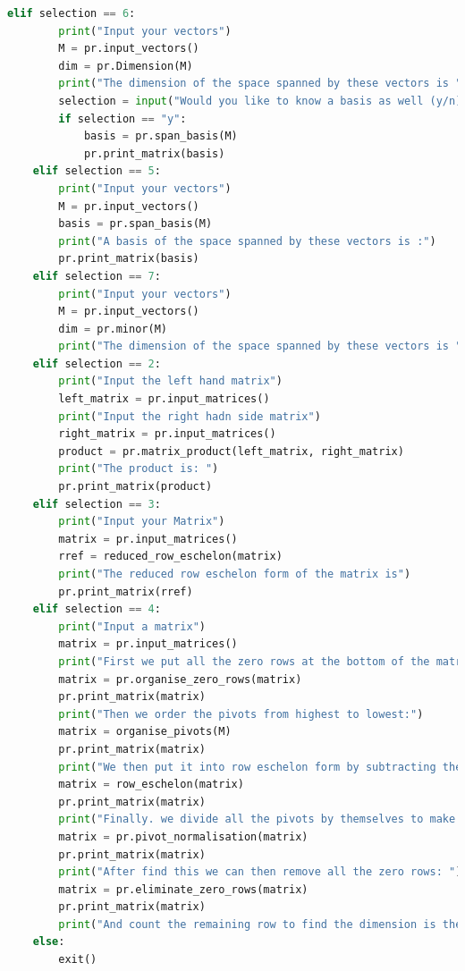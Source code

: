 \documentclass{article}
\begin{document}
\begin{lstlisting}[language=Python, caption=Text Interface, label=main]
    elif selection == 6:
        print("Input your vectors")
        M = pr.input_vectors()
        dim = pr.Dimension(M)
        print("The dimension of the space spanned by these vectors is " + str(dim) +".")
        selection = input("Would you like to know a basis as well (y/n): ")
        if selection == "y":
            basis = pr.span_basis(M)
            pr.print_matrix(basis)
    elif selection == 5:
        print("Input your vectors")
        M = pr.input_vectors()
        basis = pr.span_basis(M)
        print("A basis of the space spanned by these vectors is :")
        pr.print_matrix(basis)
    elif selection == 7:
        print("Input your vectors")
        M = pr.input_vectors()
        dim = pr.minor(M)
        print("The dimension of the space spanned by these vectors is " + str(dim) +".")
    elif selection == 2:
        print("Input the left hand matrix")
        left_matrix = pr.input_matrices()
        print("Input the right hadn side matrix")
        right_matrix = pr.input_matrices()
        product = pr.matrix_product(left_matrix, right_matrix)
        print("The product is: ")
        pr.print_matrix(product)
    elif selection == 3:
        print("Input your Matrix")
        matrix = pr.input_matrices()
        rref = reduced_row_eschelon(matrix)
        print("The reduced row eschelon form of the matrix is")
        pr.print_matrix(rref)
    elif selection == 4:
        print("Input a matrix")
        matrix = pr.input_matrices()
        print("First we put all the zero rows at the bottom of the matrix:")
        matrix = pr.organise_zero_rows(matrix)
        pr.print_matrix(matrix)
        print("Then we order the pivots from highest to lowest:")
        matrix = organise_pivots(M)
        pr.print_matrix(matrix)
        print("We then put it into row eschelon form by subtracting the rows fromm eachother: ")
        matrix = row_eschelon(matrix)
        pr.print_matrix(matrix)
        print("Finally. we divide all the pivots by themselves to make sure they're all equal to 1: ")
        matrix = pr.pivot_normalisation(matrix)
        pr.print_matrix(matrix)
        print("After find this we can then remove all the zero rows: ")
        matrix = pr.eliminate_zero_rows(matrix)
        pr.print_matrix(matrix)
        print("And count the remaining row to find the dimension is the row space is" + str(len(matrix)))
    else:
        exit()
\end{lstlisting}
\end{document}
